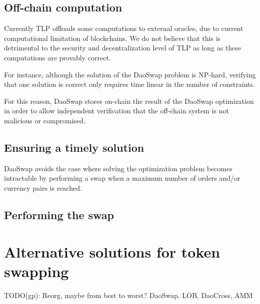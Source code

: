 \documentclass[11pt, reqno]{amsart}
\theoremstyle{definition}
\theoremstyle{remark}
\begin{document}
\subsection{Off-chain computation}
Currently TLP offloads some computations to external oracles, due to current
computational limitation of blockchains. We do not believe that this is detrimental
to the security and decentralization level of TLP as long as these computations
are provably correct.

For instance, although the solution of the DaoSwap problem is NP-hard, verifying
that one solution is correct only requires time linear in the number of
constraints.

For this reason, DaoSwap stores on-chain the result of the DaoSwap optimization
in order to allow independent verification that the off-chain system is not
malicious or compromised.

\subsection{Ensuring a timely solution}
DaoSwap avoids the case where solving the optimization problem becomes
intractable by performing a swap when a maximum number of orders and/or
currency pairs is reached.

\subsection{Performing the swap}

\section{Alternative solutions for token swapping}
\label{AlSoToSw}

TODO(gp): Reorg, maybe from best to worst? DaoSwap, LOB, DaoCross, AMM
\end{document}
